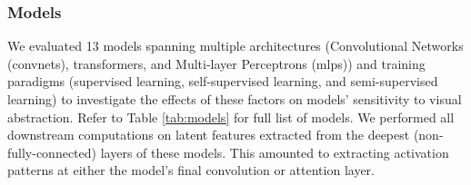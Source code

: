 \documentclass[10pt,letterpaper]{article}
\begin{document}
\subsubsection{Models} 
We evaluated 13 models spanning multiple architectures (Convolutional Networks (convnets), transformers, and Multi-layer Perceptrons (mlps)) and training paradigms (supervised learning, self-supervised learning, and semi-supervised learning) to investigate the effects of these factors on models' sensitivity to visual abstraction. 
Refer to Table \ref{tab:models} for full list of models. 
We performed all downstream computations on latent features extracted from the deepest (non-fully-connected) layers of these models. This amounted to extracting activation patterns at either the model's final convolution or attention layer.


\end{document}
